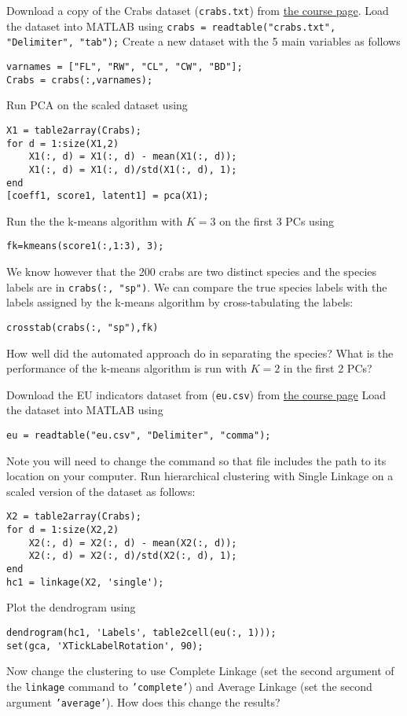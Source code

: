 \documentclass[answers]{exam}
\begin{document}
\begin{questions}
\question%
Download a copy of the Crabs dataset (\texttt{crabs.txt}) from \href{https://courses.maths.ox.ac.uk/course/view.php?id=620}{the course page}. Load the dataset into MATLAB using \verb|crabs = readtable("crabs.txt", "Delimiter", "tab");| Create a new dataset with the 5 main variables as follows \begin{verbatim}
varnames = ["FL", "RW", "CL", "CW", "BD"];
Crabs = crabs(:,varnames);
\end{verbatim} Run PCA on the scaled dataset using \begin{verbatim}
X1 = table2array(Crabs);
for d = 1:size(X1,2)
    X1(:, d) = X1(:, d) - mean(X1(:, d));
    X1(:, d) = X1(:, d)/std(X1(:, d), 1);
end
[coeff1, score1, latent1] = pca(X1);
\end{verbatim} Run the the k-means algorithm with $K=3$ on the first 3 PCs using \begin{verbatim}
fk=kmeans(score1(:,1:3), 3);
\end{verbatim}  We know however that the 200 crabs are two distinct species and the species labels are in \verb|crabs(:, "sp")|. We can compare the true species labels with the labels assigned by the k-means algorithm by cross-tabulating the labels: \begin{verbatim}
crosstab(crabs(:, "sp"),fk)
\end{verbatim} How well did the automated approach do in separating the species? What is the performance of the k-means algorithm is run with $K=2$ in the first 2 PCs?



\question%
Download the EU indicators dataset from (\texttt{eu.csv}) from \href{https://courses.maths.ox.ac.uk/course/view.php?id=620}{the course page} Load the dataset into MATLAB using \begin{verbatim}
eu = readtable("eu.csv", "Delimiter", "comma");
\end{verbatim} Note you will need to change the command so that file includes the path to its location on your computer. Run hierarchical clustering with Single Linkage on a scaled version of the dataset as follows: \begin{verbatim}
X2 = table2array(Crabs);
for d = 1:size(X2,2)
    X2(:, d) = X2(:, d) - mean(X2(:, d));
    X2(:, d) = X2(:, d)/std(X2(:, d), 1);
end
hc1 = linkage(X2, 'single');
\end{verbatim} Plot the dendrogram using \begin{verbatim}
dendrogram(hc1, 'Labels', table2cell(eu(:, 1)));
set(gca, 'XTickLabelRotation', 90);
\end{verbatim} Now change the clustering to use Complete Linkage (set the second argument of the \texttt{linkage} command to \texttt{'complete'}) and Average Linkage (set the second argument \texttt{'average'}). How does this change the results?

\end{questions}
\end{document}
